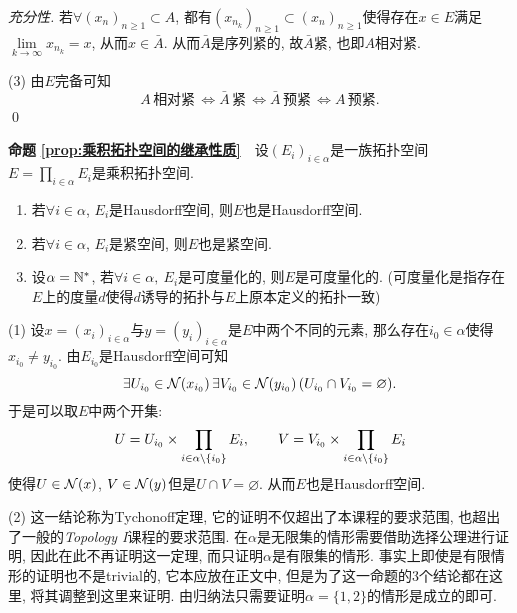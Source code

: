 \begin{appendix}
\begin{Proof}
	\textsl{充分性.} 若$ \forall (x_n)_{n\geqslant 1}\subset A $, 都有$ (x_{n_k})_{n\geqslant 1}\subset(x_n)_{n\geqslant 1} $使得存在$ x\in E $满足$ \lim\limits_{k\to\infty}x_{n_k}=x $, 从而$ x\in\bar{A} $. 从而$ \bar{A} $是序列紧的, 故$ \bar{A} $紧, 也即$ A $相对紧.
	
	(3) 由$ E $完备可知
	\[
	A\,\text{相对紧}\,\Longleftrightarrow\bar{A}\,\text{紧}\,\Longleftrightarrow\bar{A}\,\text{预紧}\,\Longleftrightarrow A\,\text{预紧}.
	\]
	\qed
	\end{Proof}
	
	\textbf{命题\,\,\ref{prop:乘积拓扑空间的继承性质}}\ \ 设$ (E_i)_{i\in\alpha} $是一族拓扑空间 $ E=\prod\limits_{i\in\alpha}E_i $是乘积拓扑空间.
		\begin{enumerate}[(1)]
		\item 若$ \forall i\in\alpha $, $ E_i $是Hausdorff空间, 则$ E $也是Hausdorff空间.
		
		\item 若$ \forall i\in\alpha $, $ E_i $是紧空间, 则$ E $也是紧空间.
		
		\item 设$ \alpha=\mathbb{N}^\ast $, 若$ \forall i\in\alpha,\ E_i $是可度量化的, 则$ E $是可度量化的. (可度量化是指存在$ E $上的度量$ d $使得$ d $诱导的拓扑与$ E $上原本定义的拓扑一致)
		\end{enumerate}
	\begin{Proof}
	(1) 设$ x=(x_i)_{i\in\alpha} $与$ y=(y_i)_{i\in\alpha} $是$ E $中两个不同的元素, 那么存在$ i_0\in\alpha $使得$ x_{i_0}\ne y_{i_0} $. 由$ E_{i_0} $是Hausdorff空间可知
	\[
	\exists U_{i_0}\in\mathcal{N}(x_{i_0})\,\exists V_{i_0}\in\mathcal{N}(y_{i_0})\,(U_{i_0}\cap V_{i_0}=\varnothing).
	\]
	于是可以取$ E $中两个开集:
	\[
	U=U_{i_0}\times\prod_{i\in\alpha\setminus\{i_0\}}E_i,\qquad V=V_{i_0}\times\prod_{i\in\alpha\setminus\{i_0\}}E_i
	\]
	使得$ U\in\mathcal{N}(x) $, $ V\in\mathcal{N}(y) $但是$ U\cap V=\varnothing $. 从而$ E $也是Hausdorff空间.
	
	(2) 这一结论称为Tychonoff定理, 它的证明不仅超出了本课程的要求范围, 也超出了一般的\textsl{Topology I}课程的要求范围. 在$ \alpha $是无限集的情形需要借助选择公理进行证明, 因此在此不再证明这一定理, 而只证明$ \alpha $是有限集的情形. 事实上即使是有限情形的证明也不是trivial的, 它本应放在正文中, 但是为了这一命题的3个结论都在这里, 将其调整到这里来证明. 由归纳法只需要证明$ \alpha=\{1,2\} $的情形是成立的即可.
	

\end{Proof}
\end{appendix}

